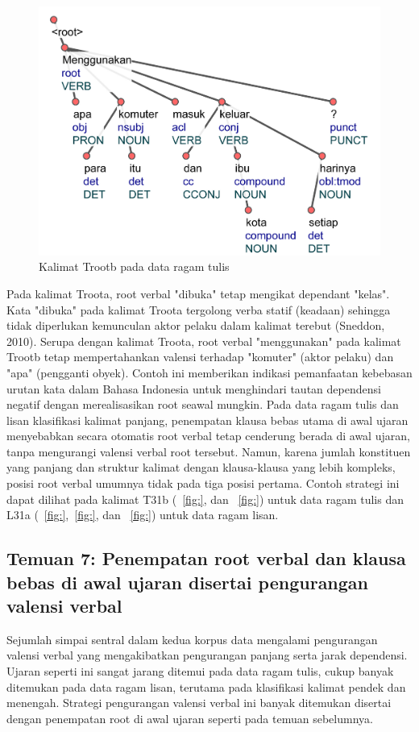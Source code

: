 \begin{figure}
	\centering \includegraphics[width=1
	\textwidth] {pics/ts7458.jpg} 
	\caption{Kalimat Trootb pada data ragam tulis}
	\label{fig:ts7458} 
\end{figure}

Pada kalimat Troota, root verbal "dibuka" tetap mengikat dependant "kelas". Kata "dibuka" pada kalimat Troota tergolong verba statif (keadaan) sehingga tidak diperlukan kemunculan aktor pelaku dalam kalimat terebut (Sneddon, 2010). Serupa dengan kalimat Troota, root verbal "menggunakan" pada kalimat Trootb tetap mempertahankan valensi terhadap "komuter" (aktor pelaku) dan "apa" (pengganti obyek). Contoh ini memberikan indikasi pemanfaatan kebebasan urutan kata dalam Bahasa Indonesia untuk menghindari tautan dependensi negatif dengan merealisasikan root seawal mungkin. Pada data ragam tulis dan lisan klasifikasi kalimat panjang, penempatan klausa bebas utama di awal ujaran menyebabkan secara otomatis root verbal tetap cenderung berada di awal ujaran, tanpa mengurangi valensi verbal root tersebut. Namun, karena jumlah konstituen yang panjang dan struktur kalimat dengan klausa-klausa yang lebih kompleks, posisi root verbal umumnya tidak pada tiga posisi pertama. Contoh strategi ini dapat dilihat pada kalimat T31b (\pic~\ref{fig:}, dan \pic~\ref{fig:}) untuk data ragam tulis dan L31a (\pic~\ref{fig:},\pic~\ref{fig:}, dan \pic~\ref{fig:}) untuk data ragam lisan.

\subsection{Temuan 7: Penempatan root verbal dan klausa bebas di awal ujaran disertai pengurangan valensi verbal}
Sejumlah simpai sentral dalam kedua korpus data mengalami pengurangan valensi verbal yang mengakibatkan pengurangan panjang serta jarak dependensi. Ujaran seperti ini sangat jarang ditemui pada data ragam tulis, cukup banyak ditemukan pada data ragam lisan, terutama pada klasifikasi kalimat pendek dan menengah. Strategi pengurangan valensi verbal ini banyak ditemukan disertai dengan penempatan root di awal ujaran seperti pada temuan sebelumnya. 

